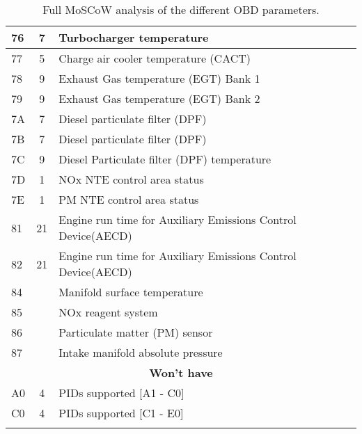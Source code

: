 \begin{longtable}{|l|c|p{10cm}|}
    76 & 7  & Turbocharger temperature                                      \\ \hline
    77 & 5  & Charge air cooler temperature (CACT)                          \\ \hline
    78 & 9  & Exhaust Gas temperature (EGT) Bank 1                          \\ \hline
    79 & 9  & Exhaust Gas temperature (EGT) Bank 2                          \\ \hline
    7A & 7  & Diesel particulate filter (DPF)                               \\ \hline
    7B & 7  & Diesel particulate filter (DPF)                               \\ \hline
    7C & 9  & Diesel Particulate filter (DPF) temperature                   \\ \hline
    7D & 1  & NOx NTE control area status                                   \\ \hline
    7E & 1  & PM NTE control area status                                    \\ \hline
    81 & 21 & Engine run time for Auxiliary Emissions Control Device(AECD)  \\ \hline
    82 & 21 & Engine run time for Auxiliary Emissions Control Device(AECD)  \\ \hline
    84 &    & Manifold surface temperature                                  \\ \hline
    85 &    & NOx reagent system                                            \\ \hline
    86 &    & Particulate matter (PM) sensor                                \\ \hline
    87 &    & Intake manifold absolute pressure                             \\ \hline
    \multicolumn{3}{|c|}{\textbf{Won't have}}                               \\ \hline
    A0 & 4  & PIDs supported [A1 - C0]                                      \\ \hline
    C0 & 4  & PIDs supported [C1 - E0]                                      \\ \hline
    \caption{Full MoSCoW analysis of the different OBD parameters.}
    \label{tab:full_moscow_pids}
\end{longtable}

